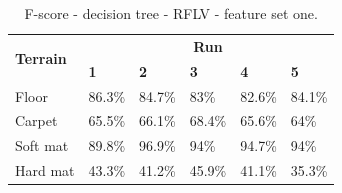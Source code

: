 \documentclass[USenglish]{ifimaster}  %
\begin{document}
\begin{table}[h]\ContinuedFloat
	\begin{subtable}[h]{1\textwidth}
		\centering
		\captionsetup{justification=centering}
			\begin{tabular}{@{}llllll@{}}
			\toprule
			\multirow{2}{*}{\textbf{Terrain}} & \multicolumn{5}{c}{\textbf{Run}} \\ \cmidrule(l){2-6} 
			& \multicolumn{1}{l|}{\textbf{1}} & \multicolumn{1}{l|}{\textbf{2}} & \multicolumn{1}{l|}{\textbf{3}} & \multicolumn{1}{l|}{\textbf{4}} & \textbf{5} \\ \midrule
			\multicolumn{1}{l|}{Floor} & \multicolumn{1}{l|}{86.3\%} & \multicolumn{1}{l|}{84.7\%} & \multicolumn{1}{l|}{83\%} & \multicolumn{1}{l|}{82.6\%} & 84.1\% \\ \midrule
			\multicolumn{1}{l|}{Carpet} & \multicolumn{1}{l|}{65.5\%} & \multicolumn{1}{l|}{66.1\%} & \multicolumn{1}{l|}{68.4\%} & \multicolumn{1}{l|}{65.6\%} & 64\% \\ \midrule
			\multicolumn{1}{l|}{Soft mat} & \multicolumn{1}{l|}{89.8\%} & \multicolumn{1}{l|}{96.9\%} & \multicolumn{1}{l|}{94\%} & \multicolumn{1}{l|}{94.7\%} & 94\% \\ \midrule
			\multicolumn{1}{l|}{Hard mat} & \multicolumn{1}{l|}{43.3\%} & \multicolumn{1}{l|}{41.2\%} & \multicolumn{1}{l|}{45.9\%} & \multicolumn{1}{l|}{41.1\%} & 35.3\% \\ \bottomrule
		\end{tabular}
		\caption{F-score - decision tree - RFLV - feature set one.}
		\label{dtfilterfscore}
	\end{subtable}
\end{table}
\end{document}
